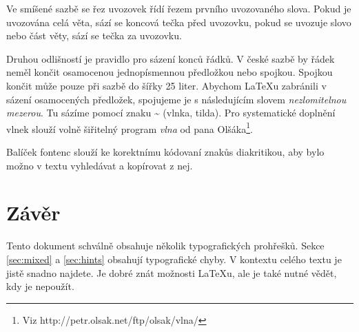 \documentclass[a4paper,10pt,twocolumn]{article}
\begin{document}
Ve smíšené sazbě se řez uvozovek řídí řezem prvního uvozovaného slova. Pokud je uvozována celá věta, sází se koncová tečka před uvozovku, pokud se uvozuje slovo nebo část věty, sází se tečka za uvozovku.

Druhou odlišností je pravidlo pro sázení konců řádků. V české sazbě by řádek neměl končit osamocenou jednopísmennou předložkou nebo spojkou. Spojkou  končit může pouze při sazbě do šířky 25 liter. Abychom {\LaTeX}u zabránili v sázení osamocených předložek, spojujeme je s následujícím slovem \emph{nezlomitelnou mezerou}. Tu sázíme pomocí znaku {\bfseries \textasciitilde} (vlnka, tilda). Pro systematické doplnění vlnek slouží volně šiřitelný program \emph{vlna} od pana Olšáka\footnote[2]{Viz {\ttfamily http://petr.olsak.net/ftp/olsak/vlna/}}.

Balíček {\ttfamily fontenc} slouží ke korektnímu kódovaní znaků\linebreak s diakritikou, aby bylo možno v textu vyhledávat a kopírovat z nej.

\section{Závěr}
\label{sec:end}

Tento dokument schválně obsahuje několik typografických prohřešků. Sekce \ref{sec:mixed} a \ref{sec:hints} obsahují typografické chyby. V kontextu celého textu je jistě snadno najdete. Je dobré znát možnosti {\LaTeX}u, ale je také nutné vědět, kdy je nepoužít.
\end{document}

